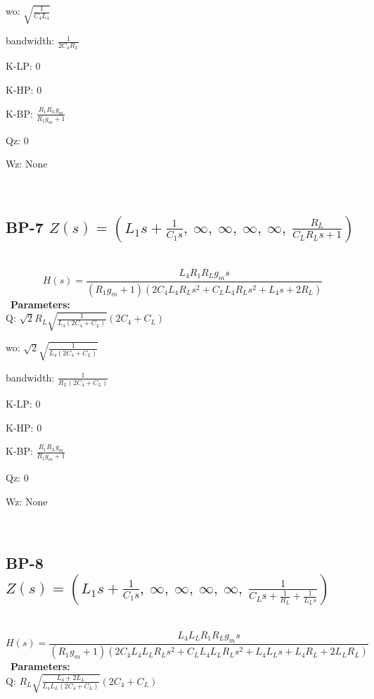 \documentclass{article}
\begin{document}
wo: $\sqrt{\frac{1}{C_{4} L_{4}}}$\ 

bandwidth: $\frac{1}{2 C_{4} R_{L}}$\ 

K-LP: $0$\ 

K-HP: $0$\ 

K-BP: $\frac{R_{1} R_{L} g_{m}}{R_{1} g_{m} + 1}$\ 

Qz: $0$\ 

Wz: $\text{None}$\ 

\ 

\subsection{BP-7 $Z(s) = \left( L_{1} s + \frac{1}{C_{1} s}, \  \infty, \  \infty, \  \infty, \  \infty, \  \frac{R_{L}}{C_{L} R_{L} s + 1}\right)$ } \ 
\textbf{\[H(s) = \frac{L_{4} R_{1} R_{L} g_{m} s}{\left(R_{1} g_{m} + 1\right) \left(2 C_{4} L_{4} R_{L} s^{2} + C_{L} L_{4} R_{L} s^{2} + L_{4} s + 2 R_{L}\right)}\] } \ 
\textbf{Parameters:}\\ 

Q: $\sqrt{2} R_{L} \sqrt{\frac{1}{L_{4} \left(2 C_{4} + C_{L}\right)}} \left(2 C_{4} + C_{L}\right)$\ 

wo: $\sqrt{2} \sqrt{\frac{1}{L_{4} \left(2 C_{4} + C_{L}\right)}}$\ 

bandwidth: $\frac{1}{R_{L} \left(2 C_{4} + C_{L}\right)}$\ 

K-LP: $0$\ 

K-HP: $0$\ 

K-BP: $\frac{R_{1} R_{L} g_{m}}{R_{1} g_{m} + 1}$\ 

Qz: $0$\ 

Wz: $\text{None}$\ 

\ 

\subsection{BP-8 $Z(s) = \left( L_{1} s + \frac{1}{C_{1} s}, \  \infty, \  \infty, \  \infty, \  \infty, \  \frac{1}{C_{L} s + \frac{1}{R_{L}} + \frac{1}{L_{L} s}}\right)$ } \ 
\textbf{\[H(s) = \frac{L_{4} L_{L} R_{1} R_{L} g_{m} s}{\left(R_{1} g_{m} + 1\right) \left(2 C_{4} L_{4} L_{L} R_{L} s^{2} + C_{L} L_{4} L_{L} R_{L} s^{2} + L_{4} L_{L} s + L_{4} R_{L} + 2 L_{L} R_{L}\right)}\] } \ 
\textbf{Parameters:}\\ 

Q: $R_{L} \sqrt{\frac{L_{4} + 2 L_{L}}{L_{4} L_{L} \left(2 C_{4} + C_{L}\right)}} \left(2 C_{4} + C_{L}\right)$\ 
\end{document}
